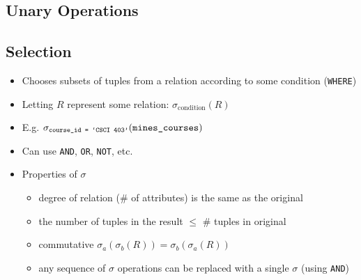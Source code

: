 \documentclass{../cheatsheet}
\begin{document}
\begin{multicols*}{2}
    \section{Unary Operations}
    \subsection{Selection}
    \begin{itemize}
        \item Chooses subsets of tuples from a relation according to some
            condition (\texttt{WHERE})

        \item Letting $R$ represent some relation:
            \(\sigma_{\text{condition}}(R)\)

        \item E.g. \( \sigma_{\text{\texttt{course\_id = `CSCI 403'}}}
            (\text{\texttt{mines\_courses}}) \)
        \item Can use \texttt{AND}, \texttt{OR}, \texttt{NOT}, etc.
        \item Properties of $\sigma$
            \begin{itemize}
                \item degree of relation (\# of attributes) is the same as the
                    original
                \item the number of tuples in the result $\leq$ \# tuples in
                    original
                \item commutative \(\sigma_{a}(\sigma_{b}(R)) =
                    \sigma_{b}(\sigma_a(R))\)
                \item any sequence of $\sigma$ operations can be replaced with a
                    single $\sigma$ (using \texttt{AND})
            \end{itemize}
    \end{itemize}


\end{multicols*}
\end{document}
